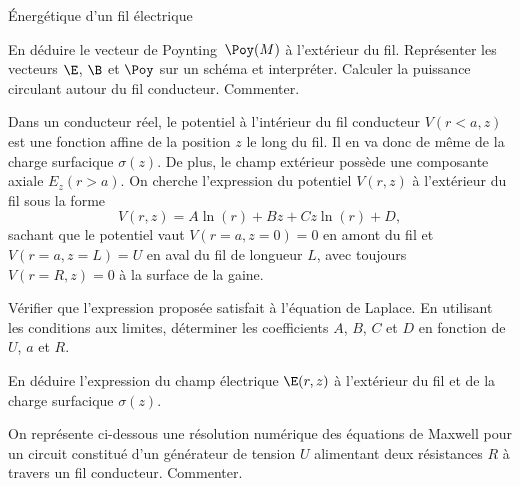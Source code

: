 \begin{exo}[PC][3][TD]{Énergétique d’un fil électrique}
\begin{quest}
\item En déduire le vecteur de Poynting~$\Poy(M)$ à l'extérieur du fil. Représenter les vecteurs $\E$, $\B$ et $\Poy$ sur un schéma et interpréter. Calculer la puissance circulant autour du fil conducteur. 
 Commenter.
\end{quest}
Dans un conducteur réel, le potentiel à l'intérieur du fil conducteur $V(r<a,z)$ est une fonction affine de la position $z$ le long du fil. Il en va donc de même de la charge surfacique $\sigma(z)$. De plus, le champ extérieur possède une composante axiale $E_z(r>a)$. On cherche l'expression du potentiel $V(r,z)$ à l'extérieur du fil sous la forme 
\begin{equation}
V(r,z) = A \ln(r) + B z + C z \ln(r) + D,
\end{equation}
sachant que le potentiel vaut $V(r=a,z=0) = 0$ en amont du fil et $V(r=a,z=L) = U$ en aval du fil de longueur $L$, avec toujours $V(r=R,z) = 0$ à la surface de la gaine.
\begin{quest}
  \item	Vérifier que l'expression proposée satisfait à l'équation de Laplace. En utilisant les conditions aux limites, déterminer les coefficients $A$, $B$, $C$ et $D$ en fonction de $U$, $a$ et $R$.
  \item En déduire l'expression du champ électrique $\E(r,z)$ à l'extérieur du fil et de la charge surfacique $\sigma(z)$.
  \item On représente ci-dessous une résolution numérique des équations de Maxwell pour un circuit constitué d'un générateur de tension $U$ alimentant deux résistances $R$ à travers un fil conducteur. Commenter.

\end{quest}
\end{exo}
